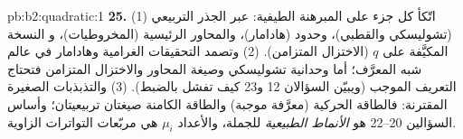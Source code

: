 \begin{solution}{pb:b2:quadratic:1}
\textbf{25.} (1) اتّكأ كل جزء على المبرهنة الطيفية:
عبر الجذر التربيعي (تشوليسكي والقطبي)، وحدود
 (هادامار)، والمحاور الرئيسية (المخروطيات)، و
النسخة المكيَّفة على $q$ (الاختزال المتزامن). (2) وتصمد
التحقيقات الغرامية وهادامار  في
عالم شبه المعرَّف؛ أما وحدانية تشوليسكي وصيغة المحاور
والاختزال المتزامن فتحتاج التعريف الموجب
(ويبيّن السؤالان 12 و23 كيف تفشل بالضبط). (3)
والتذبذبات الصغيرة المقترنة: فالطاقة الحركية (معرَّفة موجبة)
والطاقة الكامنة صيغتان تربيعيتان؛ وأساس
السؤالين 20--22 هو \emph{الأنماط الطبيعية} للجملة، والأعداد
$\mu_i$ هي مربّعات التواترات الزاوية.
\end{solution}
